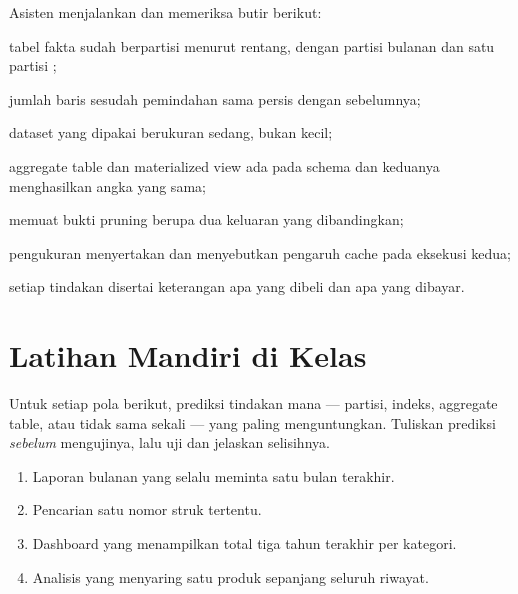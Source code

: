 \begin{checkpoint}
Asisten menjalankan  dan memeriksa butir berikut:
\begin{ceklis}
  \item tabel fakta sudah berpartisi menurut rentang, dengan partisi bulanan
        dan satu partisi ;
  \item jumlah baris sesudah pemindahan sama persis dengan sebelumnya;
  \item dataset yang dipakai berukuran sedang, bukan kecil;
  \item aggregate table dan materialized view ada pada schema 
        dan keduanya menghasilkan angka yang sama;
  \item {} memuat bukti pruning berupa dua keluaran
         yang dibandingkan;
  \item pengukuran menyertakan  dan menyebutkan pengaruh
        cache pada eksekusi kedua;
  \item setiap tindakan disertai keterangan apa yang dibeli dan apa yang
        dibayar.
\end{ceklis}
\end{checkpoint}

\section{Latihan Mandiri di Kelas}


Untuk setiap pola berikut, prediksi tindakan mana --- partisi, indeks,
aggregate table, atau tidak sama sekali --- yang paling menguntungkan.
Tuliskan prediksi \emph{sebelum} mengujinya, lalu uji dan jelaskan selisihnya.

\begin{enumerate}[leftmargin=1.4em]
  \item Laporan bulanan yang selalu meminta satu bulan terakhir.
  \item Pencarian satu nomor struk tertentu.
  \item Dashboard yang menampilkan total tiga tahun terakhir per kategori.
  \item Analisis yang menyaring satu produk sepanjang seluruh riwayat.
\end{enumerate}


